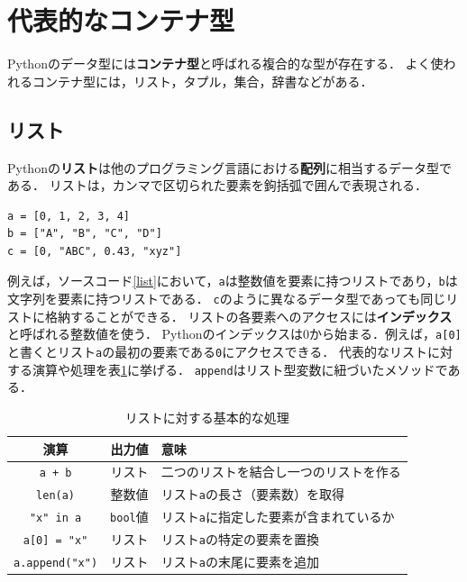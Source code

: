 \documentclass[a4paper,12pt]{jsarticle}
\begin{document}
\section{代表的なコンテナ型}

Pythonのデータ型には{\bf コンテナ型}と呼ばれる複合的な型が存在する．
よく使われるコンテナ型には，リスト，タプル，集合，辞書などがある．

\subsection{リスト}

Pythonの{\bf リスト}は他のプログラミング言語における{\bf 配列}に相当するデータ型である．
リストは，カンマで区切られた要素を鉤括弧で囲んで表現される．
\begin{lstlisting}[caption=リストの例,label=list]
a = [0, 1, 2, 3, 4]
b = ["A", "B", "C", "D"]
c = [0, "ABC", 0.43, "xyz"]
\end{lstlisting}
例えば，ソースコード\ref{list}において，\texttt{a}は整数値を要素に持つリストであり，\texttt{b}は文字列を要素に持つリストである．
\texttt{c}のように異なるデータ型であっても同じリストに格納することができる．
リストの各要素へのアクセスには{\bf インデックス}と呼ばれる整数値を使う．
Pythonのインデックスは0から始まる．例えば，\texttt{a[0]}と書くとリスト\texttt{a}の最初の要素である\texttt{0}にアクセスできる．
代表的なリストに対する演算や処理を表\ref{tab:list}に挙げる．
\texttt{append}はリスト型変数に紐づいたメソッドである．

\begin{table}[H]
    \centering
    \caption{リストに対する基本的な処理}
    \begin{tabular}{c|c|l}
        \hline
        演算 & 出力値 & 意味 \\
        \hline\hline
        \texttt{a + b} & リスト & 二つのリストを結合し一つのリストを作る \\
        \texttt{len(a)} & 整数値 & リスト\texttt{a}の長さ（要素数）を取得 \\
        \texttt{"x" in a} & \texttt{bool}値 & リスト\texttt{a}に指定した要素が含まれているか \\
        \texttt{a[0] = "x"} & リスト & リスト\texttt{a}の特定の要素を置換 \\
        \texttt{a.append("x")} & リスト & リスト\texttt{a}の末尾に要素を追加 \\
        \hline
    \end{tabular}
    \label{tab:list}
\end{table}
\end{document}

